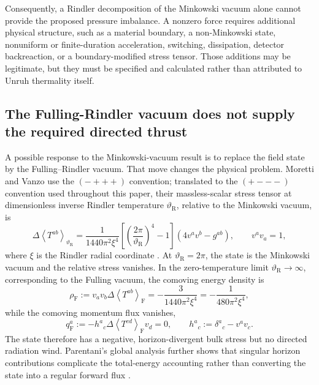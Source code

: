 \documentclass[11pt]{article}
\newcommand{\avg}[1]{\left\langle #1\right\rangle}
\begin{document}
Consequently, a Rindler decomposition of the Minkowski vacuum alone cannot provide the proposed pressure imbalance. A nonzero force requires additional physical structure, such as a material boundary, a non-Minkowski state, nonuniform or finite-duration acceleration, switching, dissipation, detector backreaction, or a boundary-modified stress tensor. Those additions may be legitimate, but they must be specified and calculated rather than attributed to Unruh thermality itself.


\subsection{The Fulling-Rindler vacuum does not supply the required directed thrust}
\label{sec:fulling_vacuum}

A possible response to the Minkowski-vacuum result is to replace the field state by the Fulling--Rindler vacuum. That move changes the physical problem. Moretti and Vanzo use the \((-+++)\) convention; translated to the \((+---)\) convention used throughout this paper, their massless-scalar stress tensor at dimensionless inverse Rindler temperature \(\vartheta_{\mathrm R}\), relative to the Minkowski vacuum, is
\begin{equation}
    \Delta\avg{T^{ab}}_{\vartheta_{\mathrm R}}
    =\frac{1}{1440\pi^{2}\xi^{4}}
      \left[\left(\frac{2\pi}{\vartheta_{\mathrm R}}\right)^{4}-1\right]
      \left(4v^{a}v^{b}-g^{ab}\right),
    \qquad v^{a}v_{a}=1,
    \label{eq:rindler_thermal_stress}
\end{equation}
where \(\xi\) is the Rindler radial coordinate \cite{MorettiVanzo1996}. At \(\vartheta_{\mathrm R}=2\pi\), the state is the Minkowski vacuum and the relative stress vanishes. In the zero-temperature limit \(\vartheta_{\mathrm R}\to\infty\), corresponding to the Fulling vacuum, the comoving energy density is
\begin{equation}
    \rho_{\mathrm F}
    :=v_{a}v_{b}\Delta\avg{T^{ab}}_{\mathrm F}
    =-\frac{3}{1440\pi^{2}\xi^{4}}
    =-\frac{1}{480\pi^{2}\xi^{4}},
    \label{eq:fulling_negative_density}
\end{equation}
while the comoving momentum flux vanishes,
\begin{equation}
    q^{a}_{\mathrm F}
    :=-h^{a}{}_{c}\Delta\avg{T^{cd}}_{\mathrm F}v_{d}
    =0,
    \qquad
    h^{a}{}_{c}:=\delta^{a}{}_{c}-v^{a}v_{c}.
    \label{eq:fulling_zero_flux}
\end{equation}
The state therefore has a negative, horizon-divergent bulk stress but no directed radiation wind. Parentani's global analysis further shows that singular horizon contributions complicate the total-energy accounting rather than converting the state into a regular forward flux \cite{Parentani1993}.
\end{document}
